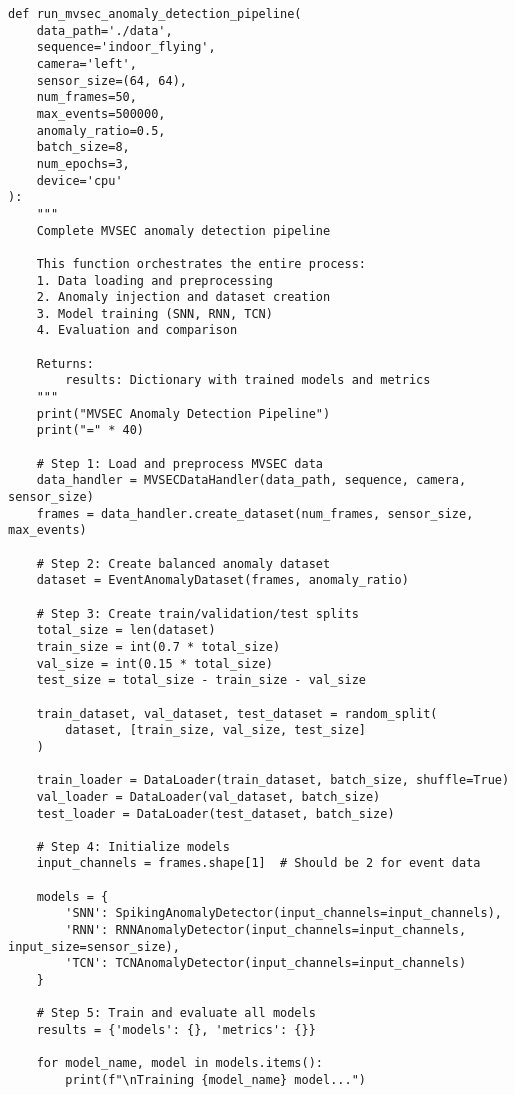 \documentclass[12pt,a4paper]{article}
\begin{document}
\begin{lstlisting}[caption={Complete Pipeline Implementation - System Orchestrator Function}]
def run_mvsec_anomaly_detection_pipeline(
    data_path='./data', 
    sequence='indoor_flying', 
    camera='left',
    sensor_size=(64, 64), 
    num_frames=50, 
    max_events=500000,
    anomaly_ratio=0.5, 
    batch_size=8, 
    num_epochs=3, 
    device='cpu'
):
    """
    Complete MVSEC anomaly detection pipeline
    
    This function orchestrates the entire process:
    1. Data loading and preprocessing
    2. Anomaly injection and dataset creation
    3. Model training (SNN, RNN, TCN)
    4. Evaluation and comparison
    
    Returns:
        results: Dictionary with trained models and metrics
    """
    print("MVSEC Anomaly Detection Pipeline")
    print("=" * 40)
    
    # Step 1: Load and preprocess MVSEC data
    data_handler = MVSECDataHandler(data_path, sequence, camera, sensor_size)
    frames = data_handler.create_dataset(num_frames, sensor_size, max_events)
    
    # Step 2: Create balanced anomaly dataset
    dataset = EventAnomalyDataset(frames, anomaly_ratio)
    
    # Step 3: Create train/validation/test splits
    total_size = len(dataset)
    train_size = int(0.7 * total_size)
    val_size = int(0.15 * total_size)
    test_size = total_size - train_size - val_size
    
    train_dataset, val_dataset, test_dataset = random_split(
        dataset, [train_size, val_size, test_size]
    )
    
    train_loader = DataLoader(train_dataset, batch_size, shuffle=True)
    val_loader = DataLoader(val_dataset, batch_size)
    test_loader = DataLoader(test_dataset, batch_size)
    
    # Step 4: Initialize models
    input_channels = frames.shape[1]  # Should be 2 for event data
    
    models = {
        'SNN': SpikingAnomalyDetector(input_channels=input_channels),
        'RNN': RNNAnomalyDetector(input_channels=input_channels, input_size=sensor_size),
        'TCN': TCNAnomalyDetector(input_channels=input_channels)
    }
    
    # Step 5: Train and evaluate all models
    results = {'models': {}, 'metrics': {}}
    
    for model_name, model in models.items():
        print(f"\nTraining {model_name} model...")
        

\end{lstlisting}
\end{document}

